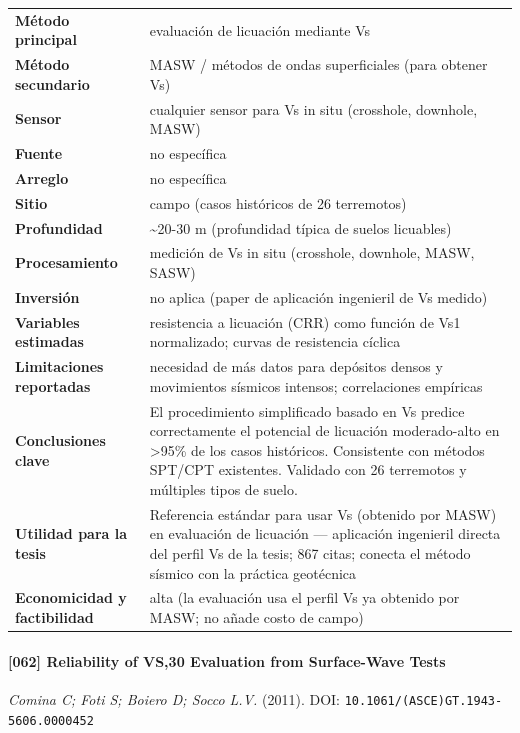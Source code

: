 \begin{center}\scriptsize
\begin{tabularx}{\textwidth}{@{}>{\bfseries}p{3.3cm} X@{}}
\toprule
M\'etodo principal & evaluación de licuación mediante Vs \\
M\'etodo secundario & MASW / métodos de ondas superficiales (para obtener Vs) \\
Sensor & cualquier sensor para Vs in situ (crosshole, downhole, MASW) \\
Fuente & no específica \\
Arreglo & no específica \\
Sitio & campo (casos históricos de 26 terremotos) \\
Profundidad & \textasciitilde{}20-30 m (profundidad típica de suelos licuables) \\
Procesamiento & medición de Vs in situ (crosshole, downhole, MASW, SASW) \\
Inversi\'on & no aplica (paper de aplicación ingenieril de Vs medido) \\
Variables estimadas & resistencia a licuación (CRR) como función de Vs1 normalizado; curvas de resistencia cíclica \\
Limitaciones reportadas & necesidad de más datos para depósitos densos y movimientos sísmicos intensos; correlaciones empíricas \\
Conclusiones clave & El procedimiento simplificado basado en Vs predice correctamente el potencial de licuación moderado-alto en >95\% de los casos históricos. Consistente con métodos SPT/CPT existentes. Validado con 26 terremotos y múltiples tipos de suelo. \\
Utilidad para la tesis & Referencia estándar para usar Vs (obtenido por MASW) en evaluación de licuación --- aplicación ingenieril directa del perfil Vs de la tesis; 867 citas; conecta el método sísmico con la práctica geotécnica \\
Economicidad y factibilidad & alta (la evaluación usa el perfil Vs ya obtenido por MASW; no añade costo de campo) \\
\bottomrule
\end{tabularx}
\end{center}

\paragraph{[062] Reliability of VS,30 Evaluation from Surface-Wave Tests} \emph{Comina C; Foti S; Boiero D; Socco L.V.} (2011).
{\scriptsize DOI: \texttt{10.1061/(ASCE)GT.1943-5606.0000452}}

